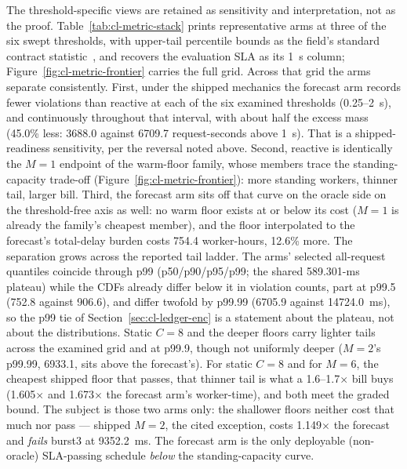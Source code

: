 The threshold-specific views are retained as sensitivity and
interpretation, not as the proof. Table~\ref{tab:cl-metric-stack} prints
representative arms at three of the six swept thresholds, with upper-tail
percentile bounds as the field's standard contract
statistic~\cite{Dean2013TailAtScale,DeCandia2007Dynamo}, and recovers the
evaluation SLA as its \SI{1}{\second} column;
Figure~\ref{fig:cl-metric-frontier} carries the full grid. Across that grid
the arms separate consistently. First, under the shipped mechanics the forecast arm records
fewer violations than reactive at each of the six examined thresholds
(0.25--\SI{2}{\second}), and continuously throughout that interval, with
about half the excess mass (45.0\% less: \num{3688.0} against \num{6709.7}
request-seconds above \SI{1}{\second}). That is a shipped-readiness
sensitivity, per the reversal noted above. Second, reactive is identically the $M{=}1$ endpoint of
the warm-floor family, whose members trace the standing-capacity trade-off
(Figure~\ref{fig:cl-metric-frontier}): more standing workers, thinner
tail, larger bill. Third, the forecast arm sits off that curve on the
oracle side on the threshold-free axis as well: no warm floor exists at or
below its cost ($M{=}1$ is already the family's cheapest member), and the
floor interpolated to the forecast's total-delay burden costs \num{754.4}
worker-hours, 12.6\% more. The separation grows across the reported tail
ladder. The arms' selected all-request quantiles coincide through p99
(p50/p90/p95/p99; the shared \num{589.301}-ms plateau) while the CDFs
already differ below it in violation counts, part
at p99.5 (\num{752.8} against \num{906.6}), and differ twofold by
p99.99 (\num{6705.9} against \SI{14724.0}{\milli\second}), so the p99 tie of
Section~\ref{sec:cl-ledger-enc} is a statement about the plateau, not
about the distributions. Static $C{=}8$ and the deeper floors carry lighter
tails across the examined grid and at p99.9, though not uniformly deeper
($M{=}2$'s p99.99, \num{6933.1}, sits above the forecast's). For static
$C{=}8$ and for $M{=}6$, the cheapest shipped floor that passes, that
thinner tail is what a 1.6--1.7$\times$ bill buys (1.605$\times$ and
1.673$\times$ the forecast arm's worker-time), and both meet the
graded bound. The subject is those two arms only: the shallower floors
neither cost that much nor pass --- shipped $M{=}2$, the cited exception,
costs 1.149$\times$ the forecast and \emph{fails} burst3 at
\SI{9352.2}{\milli\second}. The forecast arm is the only deployable (non-oracle)
SLA-passing schedule \emph{below} the standing-capacity curve.

